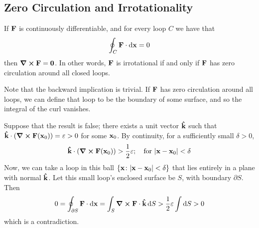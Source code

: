 \documentclass{article}
\begin{document}
\subsection{Zero Circulation and Irrotationality}
\begin{proposition}
	If $\vb F$ is continuously differentiable, and for every loop $C$ we have that
	\[ \oint_C \vb F \cdot \dd{\vb x} = 0 \]
	then $\curl{\vb F} = \vb 0$. In other words, $\vb F$ is irrotational if and only if $\vb F$ has zero circulation around all closed loops.
\end{proposition}
\noindent Note that the backward implication is trivial. If $\vb F$ has zero circulation around all loops, we can define that loop to be the boundary of some surface, and so the integral of the curl vanishes.
\begin{proposition}
	Suppose that the result is false; there exists a unit vector $\vu{k}$ such that $\vu{k} \cdot \left( \curl{\vb F(\vb x_0)} \right) = \varepsilon > 0$ for some $\vb x_0$. By continuity, for a sufficiently small $\delta > 0$,
	\[ \vu{k} \cdot \left( \curl{\vb F(\vb x_0)} \right) > \frac{1}{2}\varepsilon;\quad \text{for }\abs{\vb x - \vb x_0} < \delta \]
	Now, we can take a loop in this ball $\{ \vb x \colon \abs{\vb x - \vb x_0} < \delta \}$ that lies entirely in a plane with normal $\vu{k}$. Let this small loop's enclosed surface be $S$, with boundary $\partial S$. Then
	\[ 0 = \oint_{\partial S} \vb F \cdot \dd{\vb x} = \int_S \curl{\vb F} \cdot \vu k \dd{S} > \frac{1}{2}\varepsilon \int \dd{S} > 0 \]
	which is a contradiction.
\end{proposition}
\end{document}
